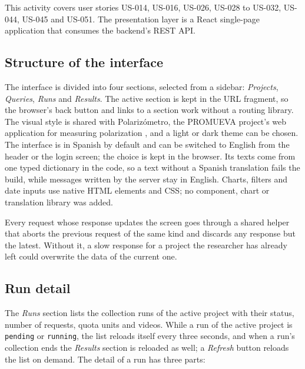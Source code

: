 This activity covers user stories US-014, US-016, US-026, US-028 to US-032, US-044, US-045 and US-051. The presentation layer is a React single-page application that consumes the backend's REST API.

\subsection{Structure of the interface}

The interface is divided into four sections, selected from a sidebar: \emph{Projects}, \emph{Queries}, \emph{Runs} and \emph{Results}. The active section is kept in the URL fragment, so the browser's back button and links to a section work without a routing library. The visual style is shared with Polarizómetro, the PROMUEVA project's web application for measuring polarization \autocite{polarizometro}, and a light or dark theme can be chosen. The interface is in Spanish by default and can be switched to English from the header or the login screen; the choice is kept in the browser. Its texts come from one typed dictionary in the code, so a text without a Spanish translation fails the build, while messages written by the server stay in English. Charts, filters and date inputs use native HTML elements and CSS; no component, chart or translation library was added.

Every request whose response updates the screen goes through a shared helper that aborts the previous request of the same kind and discards any response but the latest. Without it, a slow response for a project the researcher has already left could overwrite the data of the current one.

\subsection{Run detail}

The \emph{Runs} section lists the collection runs of the active project with their status, number of requests, quota units and videos. While a run of the active project is \texttt{pending} or \texttt{running}, the list reloads itself every three seconds, and when a run's collection ends the \emph{Results} section is reloaded as well; a \emph{Refresh} button reloads the list on demand. The detail of a run has three parts:

